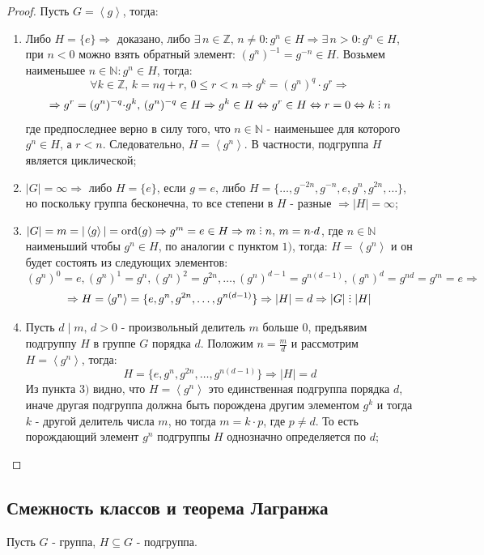 \documentclass[12pt]{article}
\newcommand{\MN}{\mathbb{N}}
\newcommand{\MZ}{\mathbb{Z}}
\theoremstyle{definition}
\DeclareRobustCommand{\divby}{%
	\mathrel{\text{\vbox{\baselineskip.65ex\lineskiplimit0pt\hbox{.}\hbox{.}\hbox{.}}}}%
}
\newcommand{\linsp}[1]{\left\langle #1 \right\rangle }
\DeclareMathOperator\ord{ord}
\begin{document}
\begin{proof}
	Пусть $G = \linsp{g}$, тогда:
	\begin{enumerate}[label=\arabic*)]
		\item Либо $H = \{e\} \Rightarrow$ доказано, либо $\exists \, n \in \MZ, \, n  \neq 0 \colon g^n \in H \Rightarrow \exists \, n > 0 \colon g^n \in H$, при $n < 0$ можно взять обратный элемент: $(g^n)^{-1} = g^{-n} \in H$. Возьмем наименьшее $n \in \MN \colon g^n \in H$, тогда:
		$$
			\forall k \in \MZ, \, k = nq + r, \, 0 \leq r < n \Rightarrow g^k = (g^n)^q{\cdot}g^r  \Rightarrow  
		$$	
		$$
			\Rightarrow g^r = (g^n)^{-q}{\cdot}g^k, \, (g^n)^{-q} \in H \Rightarrow g^k \in H \Leftrightarrow g^r \in H \Leftrightarrow r = 0 \Leftrightarrow k \divby n
		$$
		где предпоследнее верно в силу того, что $n \in \MN$ - наименьшее для которого $g^n \in H$, а $r < n$. Следовательно, $H = \linsp{g^n}$. В частности, подгруппа $H$ является циклической;
		\item $|G| = \infty \Rightarrow$ либо $H = \{e\}$, если $g = e$, либо $H = \{\dotsc, g^{-2n}, g^{-n}, e,g^{n}, g^{2n}, \dotsc \}$, но поскольку группа бесконечна, то все степени в $H$ - разные $\Rightarrow |H| = \infty$;
		\item $|G| = m =|\linsp{g}| = \ord(g) \Rightarrow g^m = e \in H \Rightarrow m \divby n, \, m = n{\cdot}d$, где $n \in \MN$ наименьший чтобы $g^n \in H$, по аналогии с пунктом $1)$, тогда: $H = \linsp{g^n}$ и он будет состоять из следующих элементов:
		$$
			(g^n)^0 = e, (g^n)^1 = g^n,(g^n)^2 = g^{2n}, \dotsc, (g^n)^{d-1} = g^{n(d-1)}, (g^n)^d = g^{nd} = g^{m} = e \Rightarrow 
		$$
		$$
			\Rightarrow H = \linsp{g^n} = \{e,g^n, g^{2n}, \dotsc, g^{n(d-1)}\} \Rightarrow |H| = d \Rightarrow |G| \divby |H|
		$$
		\item Пусть $d \mid m, \, d > 0$ - произвольный делитель $m$ больше $0$, предъявим подгруппу $H$ в группе $G$ порядка $d$. Положим $n = \tfrac{m}{d}$ и рассмотрим $H = \linsp{g^n}$, тогда:
		$$
			H = \{e,g^n, g^{2n}, \dotsc, g^{n(d-1)}\} \Rightarrow |H| = d
		$$
		Из пункта $3)$ видно, что $H = \linsp{g^n}$ это единственная подгруппа порядка $d$, иначе другая подгруппа должна быть порождена другим элементом $g^k$ и тогда $k$ - другой делитель числа $m$, но тогда $m = k{\cdot}p$, где $p \neq d$. То есть порождающий элемент $g^n$ подгруппы $H$ однозначно определяется по $d$;
	\end{enumerate}
\end{proof}

\subsection*{Смежность классов и теорема Лагранжа}
Пусть $G$ - группа, $H\subseteq G$ - подгруппа.
\end{document}
